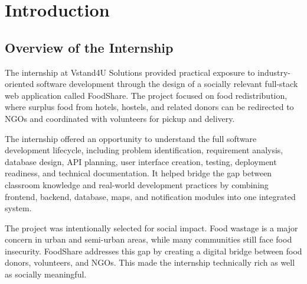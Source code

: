 \documentclass[12pt,a4paper]{report}
\newcommand{\companybrand}{Vstand4U Solutions}
\newcommand{\projecttitle}{FoodShare}
\begin{document}
\clearpage
\tableofcontents
\clearpage
\listoffigures
\clearpage
\listoftables

\clearpage
{}

\chapter{Introduction}

\section{Overview of the Internship}
The internship at \companybrand{} provided practical exposure to industry-oriented software development through the design of a socially relevant full-stack web application called \projecttitle. The project focused on food redistribution, where surplus food from hotels, hostels, and related donors can be redirected to NGOs and coordinated with volunteers for pickup and delivery.

The internship offered an opportunity to understand the full software development lifecycle, including problem identification, requirement analysis, database design, API planning, user interface creation, testing, deployment readiness, and technical documentation. It helped bridge the gap between classroom knowledge and real-world development practices by combining frontend, backend, database, maps, and notification modules into one integrated system.

The project was intentionally selected for social impact. Food wastage is a major concern in urban and semi-urban areas, while many communities still face food insecurity. \projecttitle{} addresses this gap by creating a digital bridge between food donors, volunteers, and NGOs. This made the internship technically rich as well as socially meaningful.
\end{document}
